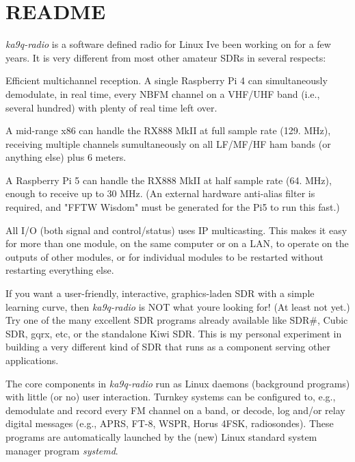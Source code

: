 \chapter{README}
\hypertarget{md__2Users_2karn_2src_2ka9q-radio_2README}{}\label{md__2Users_2karn_2src_2ka9q-radio_2README}
{\itshape ka9q-\/radio} is a software defined radio for Linux I\textquotesingle{}ve been working on for a few years. It is very different from most other amateur SDRs in several respects\+:


\begin{DoxyEnumerate}
\item Efficient multichannel reception. A single Raspberry Pi 4 can simultaneously demodulate, in real time, every NBFM channel on a VHF/\+UHF band (i.\+e., several hundred) with plenty of real time left over.
\end{DoxyEnumerate}

A mid-\/range x86 can handle the RX888 Mk\+II at full sample rate (129. MHz), receiving multiple channels sumultaneously on all LF/\+MF/\+HF ham bands (or anything else) plus 6 meters.

A Raspberry Pi 5 can handle the RX888 Mk\+II at half sample rate (64. MHz), enough to receive up to 30 MHz. (An external hardware anti-\/alias filter is required, and "{}\+FFTW Wisdom"{} must be generated for the Pi5 to run this fast.)


\begin{DoxyEnumerate}
\item All I/O (both signal and control/status) uses IP multicasting. This makes it easy for more than one module, on the same computer or on a LAN, to operate on the outputs of other modules, or for individual modules to be restarted without restarting everything else.
\end{DoxyEnumerate}

If you want a user-\/friendly, interactive, graphics-\/laden SDR with a simple learning curve, then {\itshape ka9q-\/radio} is NOT what you\textquotesingle{}re looking for! (At least not yet.) Try one of the many excellent SDR programs already available like SDR\#, Cubic SDR, gqrx, etc, or the standalone Kiwi SDR. This is my personal experiment in building a very different kind of SDR that runs as a component serving other applications.

The core components in {\itshape ka9q-\/radio} run as Linux \textquotesingle{}daemons\textquotesingle{} (background programs) with little (or no) user interaction. Turnkey systems can be configured to, e.\+g., demodulate and record every FM channel on a band, or decode, log and/or relay digital messages (e.\+g., APRS, FT-\/8, WSPR, Horus 4FSK, radiosondes). These programs are automatically launched by the (new) Linux standard system manager program {\itshape systemd}.

